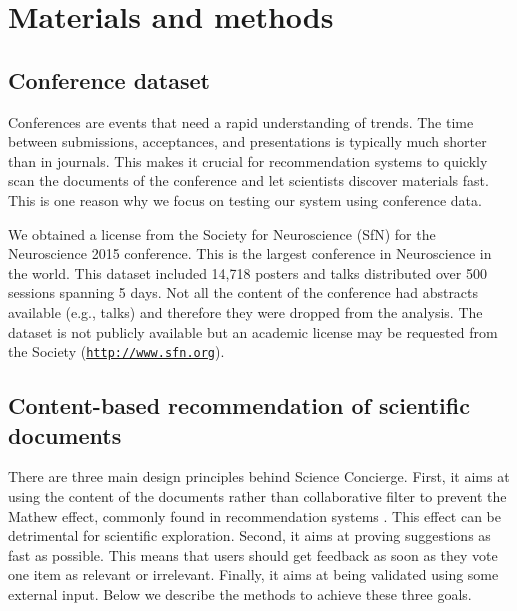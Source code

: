 \documentclass[a4paper]{article}
\begin{document}
\section{Materials and methods} \label{methods}

\subsection{Conference dataset}

Conferences are events that need a rapid understanding of trends. The time between submissions, acceptances, and presentations is typically much shorter than in journals. This makes it crucial for recommendation systems to quickly scan the documents of the conference and let scientists discover materials fast. This is one reason why we focus on testing our system using conference data.


We obtained a license from the Society for Neuroscience (SfN) for the Neuroscience 2015 conference. This is the largest conference in Neuroscience in the world. This dataset included 14,718 posters and talks distributed over 500 sessions spanning 5 days. Not all the content of the conference had abstracts available (e.g., talks) and therefore they were dropped from the analysis. The dataset is not publicly available but an academic license may be requested from the Society (\href{https://www.sfn.org}{\texttt{http://www.sfn.org}}).


\subsection{Content-based recommendation of scientific documents}


There are three main design principles behind Science Concierge. First, it aims at using the content of the documents rather than collaborative filter to prevent the Mathew effect, commonly found in recommendation systems  \cite{petersen2011quantitative}. This effect can be detrimental for scientific exploration. Second, it aims at proving suggestions as fast as possible. This means that users should get feedback as soon as they vote one item as relevant or irrelevant. Finally, it aims at being validated using some external input. Below we describe the methods to achieve these three goals.
\end{document}
